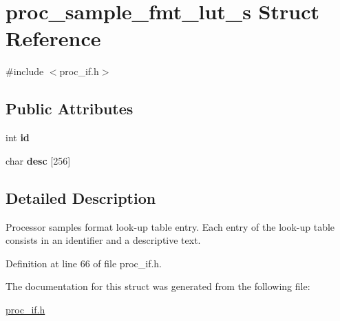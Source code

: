 \hypertarget{structproc__sample__fmt__lut__s}{}\section{proc\+\_\+sample\+\_\+fmt\+\_\+lut\+\_\+s Struct Reference}
\label{structproc__sample__fmt__lut__s}


{\ttfamily \#include $<$proc\+\_\+if.\+h$>$}

\subsection*{Public Attributes}
\begin{DoxyCompactItemize}
\item 
int {\bfseries id}\hypertarget{structproc__sample__fmt__lut__s_a89ce766157fc277f0799dc04d6884ba7}{}\label{structproc__sample__fmt__lut__s_a89ce766157fc277f0799dc04d6884ba7}

\item 
char {\bfseries desc} \mbox{[}256\mbox{]}\hypertarget{structproc__sample__fmt__lut__s_a2473a0886f9617ae93ff35d7d2423220}{}\label{structproc__sample__fmt__lut__s_a2473a0886f9617ae93ff35d7d2423220}

\end{DoxyCompactItemize}


\subsection{Detailed Description}
Processor samples format look-\/up table entry. Each entry of the look-\/up table consists in an identifier and a descriptive text. 

Definition at line 66 of file proc\+\_\+if.\+h.



The documentation for this struct was generated from the following file\+:\begin{DoxyCompactItemize}
\item 
\hyperlink{proc__if_8h}{proc\+\_\+if.\+h}\end{DoxyCompactItemize}
